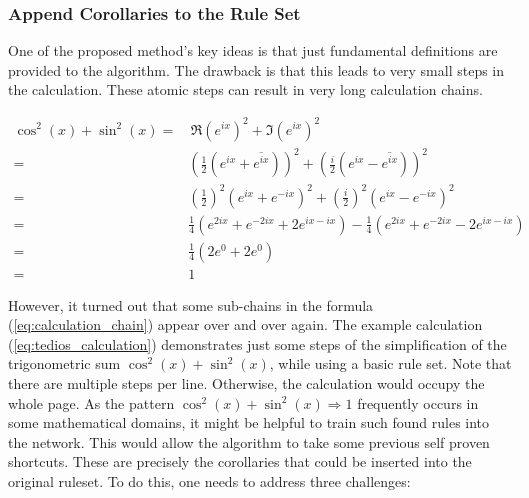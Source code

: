 \documentclass{scrartcl}
\theoremstyle{definition}
\begin{document}
\subsubsection{Append Corollaries to the Rule Set}

One of the proposed method's key ideas is that just fundamental definitions are provided to the algorithm.
The drawback is that this leads to very small steps in the calculation.
These atomic steps can result in very long calculation chains.%

\begin{equation}
	\label{eq:tedios_calculation}
	\begin{aligned}
		\cos^2(x)+\sin^2(x) = &\, \Re\left(e^{ix}\right)^2+\Im\left(e^{ix}\right)^2 \\
		= & \left(\frac{1}{2} \left(e^{ix}+\overline{e^{ix}}\right)\right)^2 + \left(\frac{i}{2} \left(e^{ix}-\overline{e^{ix}}\right)\right)^2 \\
		= & \left(\frac{1}{2}\right)^2 \left(e^{ix}+e^{-ix}\right)^2 + \left(\frac{i}{2}\right)^2 \left(e^{ix}-e^{-ix}\right)^2 \\
		= & \frac{1}{4} \left(e^{2ix}+e^{-2ix}+2e^{ix-ix}\right) - \frac{1}{4} \left(e^{2ix}+e^{-2ix}-2e^{ix-ix}\right) \\
		= & \frac{1}{4} \left( 2e^0+2e^0 \right) \\
		= & 1
	\end{aligned}
\end{equation}

However, it turned out that some sub-chains in the formula (\ref{eq:calculation_chain}) appear over and over again.
The example calculation (\ref{eq:tedios_calculation}) demonstrates just some steps of the simplification of the trigonometric sum $\cos^2(x)+\sin^2(x)$, while using a basic rule set.
Note that there are multiple steps per line. Otherwise, the calculation would occupy the whole page.
As the pattern $\cos^2(x)+\sin^2(x) \Longrightarrow 1$ frequently occurs in some mathematical domains, it might be helpful to train such found rules into the network.
This would allow the algorithm to take some previous self proven shortcuts.
These are precisely the corollaries that could be inserted into the original ruleset.
To do this, one needs to address three challenges:
\end{document}
